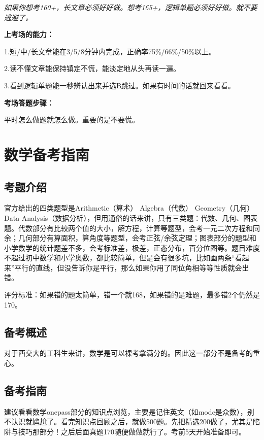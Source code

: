 \documentclass[cn,plain]{./src/qyxfbook}
\newcommand{\red}[1]{\textcolor[rgb]{1,0,0}{#1}}
\begin{document}
			
			\red{\itshape \Large 如果你想考160+，长文章必须好好做。想考165+，逻辑单题必须好好做。就不要逃避了。}

			
			\textbf{上考场的能力：}\par
			1.短/中/长文章能在3/5/8分钟内完成，正确率75\%/66\%/50\%以上。\par
			2.读不懂文章能保持镇定不慌，能淡定地从头再读一遍。\par
			3.看到逻辑单题能一秒辨认出来并选B跳过。如果有时间的话就回来看看。

			
			\textbf{考场答题步骤：}\par
			平时怎么做题就怎么做。重要的是不要慌。

			
		
	
	

	\chapter{数学备考指南}
		
		\section{考题介绍}
			官方给出的四类题型是Arithmetic（算术） Algebra（代数） Geometry（几何） Data Analysis（数据分析），但用通俗的话来讲，只有三类题：代数、几何、图表题。代数部分有比较两个值的大小，解方程，计算等题型，会考一元二次方程和同余；几何部分有算面积，算角度等题型，会考正弦/余弦定理；图表部分的题型和小学数学的统计题差不多，会考标准差，极差，正态分布，百分位图等。题目难度不超过初中数学和小学奥数，都比较简单，但是会有很多坑，比如画两条“看起来”平行的直线，但没告诉你是平行，那么如果你用了同位角相等等性质就会出错。

			
			评分标准：如果错的题太简单，错一个就168，如果错的是难题，最多错2个仍然是170。
		
	
		\section{备考概述}
			对于西交大的工科生来讲，数学是可以裸考拿满分的。因此这一部分不是备考的重心。
		
	
		\section{备考指南}
			建议看看数学onepass部分的知识点浏览，主要是记住英文（如mode是众数），别不认识就尴尬了。看完知识点回顾之后，就做500题。先把精选200做了，尤其是\red{陷阱与技巧}那部分！之后后面真题170随便做做就行了。考前5天开始准备即可。
		
\end{document}
